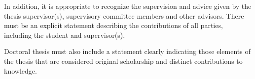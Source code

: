 \begin{prefatory}
\noindent
In addition, it is appropriate to recognize the supervision and advice
given by the thesis supervisor(s), supervisory committee members and
other advisors.
\contribution%
There must be an explicit statement describing the contributions of all
parties, including the student and supervisor(s).

\noindent
Doctoral thesis must also include a statement clearly indicating those
elements of the thesis that are considered original scholarship and
distinct contributions to knowledge.

\tableofcontents%
%
%
\end{prefatory}
%
